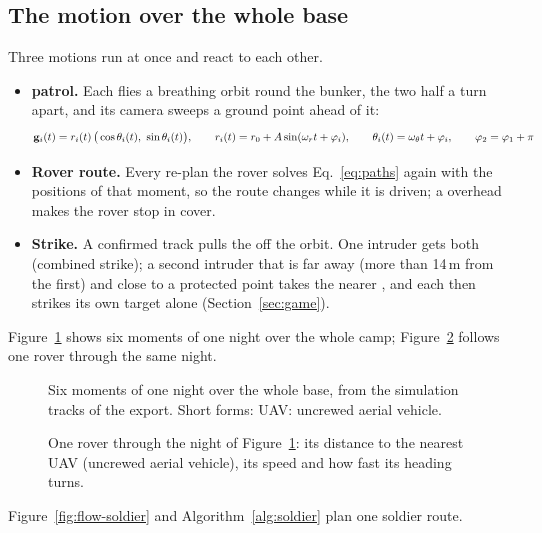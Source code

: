 \FloatBarrier
\subsection{The motion over the whole base}
\label{sec:motion}
Three motions run at once and react to each other.
\begin{itemize}
\item \textbf{ patrol.} Each  flies a breathing orbit round the bunker, the two half a turn apart, and its camera
sweeps a ground point ahead of it:
\begin{equation}
\mathbf{g}_i(t)=r_i(t)\,\big(\cos\theta_i(t),\ \sin\theta_i(t)\big),\qquad
r_i(t)=r_0+A\sin(\omega_r t+\varphi_i),\qquad \theta_i(t)=\omega_\theta t+\varphi_i,\qquad \varphi_2=\varphi_1+\pi
\label{eq:orbit}
\end{equation}
\item \textbf{Rover route.} Every re-plan the rover solves Eq.~\eqref{eq:paths} again with the  positions of that
moment, so the route changes while it is driven; a  overhead makes the rover stop in cover.
\item \textbf{Strike.} A confirmed track pulls the  off the orbit. One intruder gets both  (combined strike);
a second intruder that is far away (more than 14\,m from the first) and close to a protected point
takes the nearer , and each  then strikes its own target alone (Section~\ref{sec:game}).
\end{itemize}
Figure~\ref{fig:paths} shows six moments of one night over the whole camp; Figure~\ref{fig:motionseries} follows one
rover through the same night.

\begin{figure}[htbp]
\centering
{}
\caption{Six moments of one night over the whole base, from the simulation tracks of the export. Short forms: UAV: uncrewed aerial vehicle.}
\label{fig:paths}
\end{figure}

\begin{figure}[htbp]
\centering
{}
\caption{One rover through the night of Figure~\ref{fig:paths}: its distance to the nearest UAV (uncrewed aerial vehicle), its speed and
how fast its heading turns.}
\label{fig:motionseries}
\end{figure}

Figure~\ref{fig:flow-soldier} and Algorithm~\ref{alg:soldier} plan one soldier route.
\flowSoldier
\algSoldier

